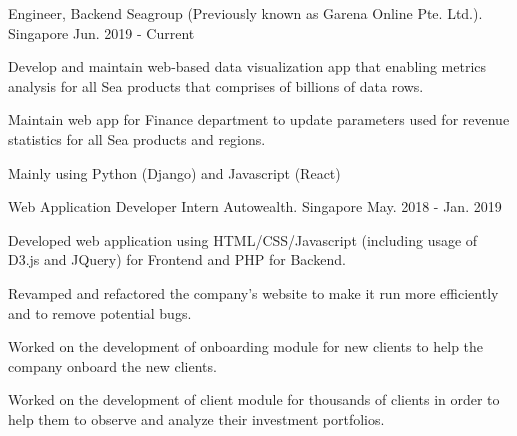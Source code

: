 

\begin{cventries}

  \cventry
    {Engineer, Backend} %
    {Seagroup (Previously known as Garena Online Pte. Ltd.).} %
    {Singapore} %
    {Jun. 2019 - Current} %
    {
      \begin{cvitems} %
        \item {Develop and maintain web-based data visualization app that enabling metrics analysis for all Sea products that comprises of billions of data rows.}
        \item {Maintain web app for Finance department to update parameters used for revenue statistics for all Sea products and regions.}
        \item {Mainly using Python (Django) and Javascript (React)}
      \end{cvitems}
    }

  \cventry
    {Web Application Developer Intern} %
    {Autowealth.} %
    {Singapore} %
    {May. 2018 - Jan. 2019} %
    {
      \begin{cvitems} %
        \item {Developed web application using HTML/CSS/Javascript (including usage of D3.js and JQuery) for Frontend and PHP for Backend.}
        \item {Revamped and refactored the company’s website to make it run more efficiently and to remove potential bugs.}
        \item {Worked on the development of onboarding module for new clients to help the company onboard the new clients.}
        \item {Worked on the development of client module for thousands of clients in order to help them to observe and analyze their investment portfolios.}
      \end{cvitems}
    }

\end{cventries}
